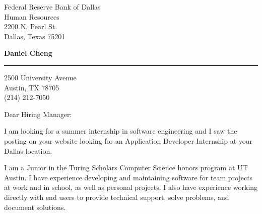 \documentclass{letter} %
\begin{document}
\signature{Daniel Cheng}                   %
\longindentation=0pt                       %
\let\raggedleft\raggedright                %
 
 
\begin{letter}{Federal Reserve Bank of Dallas \\
Human Resources \\
2200 N. Pearl St. \\
Dallas, Texas 75201}

\begin{center}
{\large\bf Daniel Cheng} 
\end{center}
\medskip\hrule height 1pt
\begin{center}
{2500 University Avenue \\   Austin, TX 78705 \\ (214) 212-7050}
\end{center}
\addvspace{1in}
 
\opening{Dear Hiring Manager:} 
 
\noindent I am looking for a summer internship in software engineering
and I saw the posting on your website looking for an Application Developer Internship
at your Dallas location.
 
\noindent I am a Junior in the Turing Scholars Computer Science honors
program at UT Austin. I have experience developing and maintaining software
for team projects at work and in school, as well as personal projects. I
also have experience working directly with end users to provide technical
support, solve problems, and document solutions.
 

\end{letter}
\end{document}
